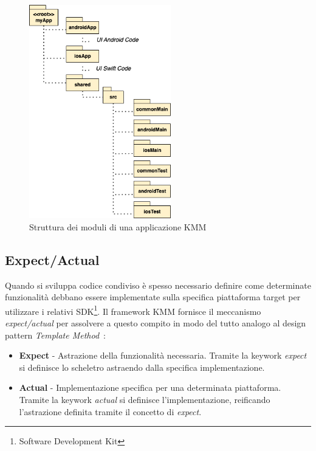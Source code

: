\begin{figure}[H]
    \centering
    \includegraphics[width=0.55\textwidth]{img/struttura_app_kmm.png}
    \caption{Struttura dei moduli di una applicazione KMM}
\end{figure}

\subsection{Expect/Actual}
Quando si sviluppa codice condiviso è spesso necessario definire come determinate funzionalità debbano essere implementate sulla specifica piattaforma target per utilizzare i relativi SDK\footnote{Software Development Kit}. 
Il framework KMM fornisce il meccanismo \textit{expect/actual} per assolvere a questo compito in modo del tutto analogo al design pattern \textit{Template Method}~\cite{gamma1994design}:

\begin{itemize}
    \item \textbf{Expect} - Astrazione della funzionalità necessaria. Tramite la keywork \textit{expect} si definisce lo scheletro astraendo dalla specifica implementazione.
    
    \item \textbf{Actual} - Implementazione specifica per una determinata piattaforma. Tramite la keywork \textit{actual} si definisce l'implementazione, reificando l'astrazione definita tramite il concetto di \textit{expect}.
\end{itemize}

